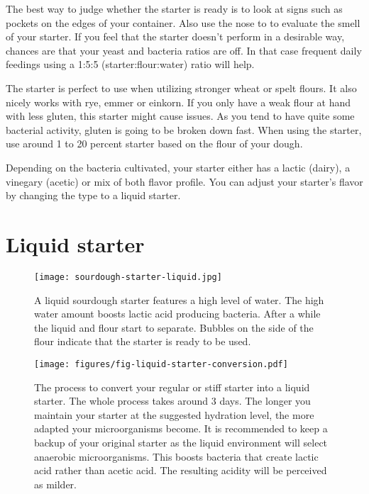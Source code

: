 The best way to judge whether the starter is ready is to look at signs such as
pockets on the edges of your container. Also use the nose to to evaluate the
smell of your starter. If you feel that the starter doesn't perform in a
desirable way, chances are that your yeast and bacteria ratios are off. In that
case frequent daily feedings using a 1:5:5 (starter:flour:water) ratio will
help.

The starter is perfect to use when utilizing stronger wheat or spelt flours.
It also nicely works with rye, emmer or einkorn. If you only have a weak flour
at hand with less gluten, this starter might cause issues. As you tend to have
quite some bacterial activity, gluten is going to be broken down fast. When
using the starter, use around 1 to 20 percent starter based on the flour of your
dough.

Depending on the bacteria cultivated, your starter either has a lactic (dairy),
a vinegary (acetic) or mix of both flavor profile. You can adjust your
starter's flavor by changing the type to a liquid starter.

\section{Liquid starter}
\label{section:liquid-starter}

\begin{figure}[!htb]
  \centering
  \texttt{[image: sourdough-starter-liquid.jpg]}
  \caption{A liquid sourdough starter features a high level of water. The high
  water amount boosts lactic acid producing bacteria. After a while the liquid
  and flour start to separate. Bubbles on the side of the flour
  indicate that the starter is ready to be used.}
  \label{fig:liquid-sourdough-starter}
\end{figure}


\begin{figure}[!htb]
  \texttt{[image: figures/fig-liquid-starter-conversion.pdf]}
  \caption{The process to convert your regular or stiff starter into a liquid starter. The whole
  process takes around 3 days. The longer you maintain your starter at the
  suggested hydration level, the more adapted your microorganisms become. It is recommended
  to keep a backup of your original starter as the liquid environment will select
  anaerobic microorganisms. This boosts bacteria that create lactic acid rather
  than acetic acid. The resulting acidity will be perceived as milder.}
  \label{fig:liquid-starter-conversion}
\end{figure}

